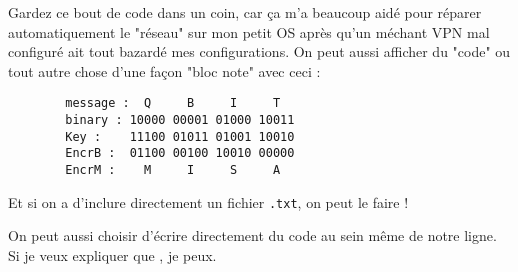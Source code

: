 Gardez ce bout de code dans un coin, car ça m'a beaucoup aidé pour réparer automatiquement le
"réseau" sur mon petit OS après qu'un méchant VPN mal configuré ait tout bazardé mes
configurations.
\ideaEnd
On peut aussi afficher du "code" ou tout autre chose d'une façon "bloc note" avec ceci :
\begin{mycodebox}
    \begin{verbatim}
        message :  Q     B     I     T
        binary : 10000 00001 01000 10011
        Key :    11100 01011 01001 10010
        EncrB :  01100 00100 10010 00000
        EncrM :    M     I     S     A
    \end{verbatim}
\end{mycodebox}

Et si on a  d'inclure directement un fichier \texttt{.txt}, on peut le faire !


On peut aussi choisir d'écrire directement du code au sein même de notre ligne. Si je veux expliquer que
, je peux.

